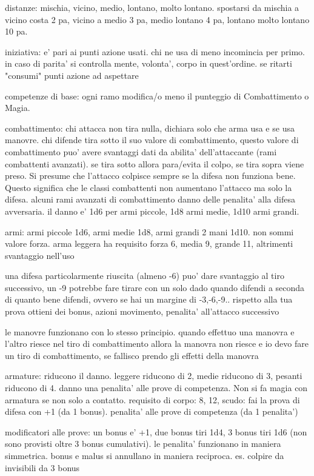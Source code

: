 \documentclass[12pt,a4paper,twoside,openany,twocolumn]{book}
\begin{document}
distanze: mischia, vicino, medio, lontano, molto lontano. spostarsi da mischia a vicino costa 2 pa, vicino a medio 3 pa, medio lontano 4 pa, lontano molto lontano 10 pa.

iniziativa: e' pari ai punti azione usati. chi ne usa di meno incomincia per primo. in caso di parita' si controlla mente, volonta', corpo in quest'ordine. se ritarti "consumi" punti azione ad aspettare

competenze di base: ogni ramo modifica/o meno il punteggio di Combattimento o Magia.

combattimento: chi attacca non tira nulla, dichiara solo che arma usa e se usa manovre. chi difende tira sotto il suo valore di combattimento, questo valore di combattimento puo' avere svantaggi dati da abilita' dell'attaccante (rami combattenti avanzati). se tira sotto allora para/evita il colpo, se tira sopra viene preso.
Si presume che l'attacco colpisce sempre se la difesa non funziona bene. Questo significa che le classi combattenti non aumentano l'attacco ma solo la difesa. alcuni rami avanzati di combattimento danno delle penalita' alla difesa avversaria.
il danno e' 1d6 per armi piccole, 1d8 armi medie, 1d10 armi grandi. 

armi: armi piccole 1d6, armi medie 1d8, armi grandi 2 mani 1d10. non sommi valore forza. arma leggera ha requisito forza 6, media 9, grande 11, altrimenti svantaggio nell'uso

una difesa particolarmente riuscita (almeno -6) puo' dare svantaggio al tiro successivo, un -9 potrebbe fare tirare con un solo dado
quando difendi  a seconda di quanto bene difendi, ovvero se hai un margine di -3,-6,-9.. rispetto alla tua prova ottieni dei bonus, azioni movimento, penalita' all'attacco successivo

le manovre funzionano con lo stesso principio. quando effettuo una manovra e l'altro riesce nel tiro di combattimento allora la manovra non riesce e io devo fare un tiro di combattimento, se fallisco prendo gli effetti della manovra

armature: riducono il danno. leggere riducono di 2, medie riducono di 3, pesanti riducono di 4. danno una penalita' alle prove di competenza. Non si fa magia con armatura se non solo a contatto. requisito di corpo: 8, 12, 
scudo: fai la prova di difesa con +1 (da 1 bonus). penalita' alle prove di competenza (da 1 penalita')

modificatori alle prove: un bonus e' +1, due bonus tiri 1d4, 3 bonus tiri 1d6 (non sono provisti oltre 3 bonus cumulativi). le penalita' funzionano in maniera simmetrica. bonus e malus si annullano in maniera reciproca. es. colpire da invisibili da 3 bonus
\end{document}
